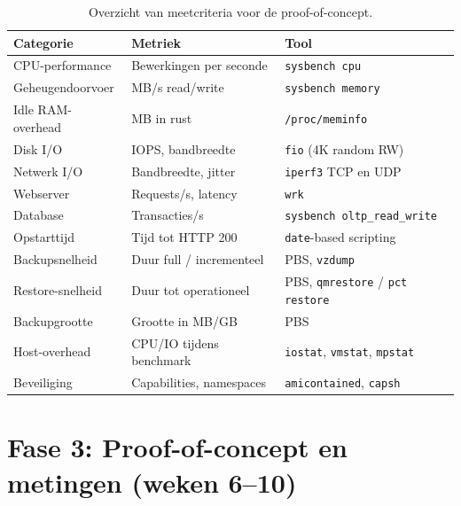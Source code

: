 \begin{table}[h]
    \centering
    \caption[Meetcriteria PoC]{Overzicht van meetcriteria voor de proof-of-concept.}
    \label{tab:meetcriteria}
    \begin{tabular}{lll}
        \toprule
        \textbf{Categorie} & \textbf{Metriek} & \textbf{Tool} \\
        \midrule
        CPU-performance        & Bewerkingen per seconde   & \texttt{sysbench cpu} \\
        Geheugendoorvoer       & MB/s read/write           & \texttt{sysbench memory} \\
        Idle RAM-overhead      & MB in rust                & \texttt{/proc/meminfo} \\
        Disk I/O               & IOPS, bandbreedte         & \texttt{fio} (4K random RW) \\
        Netwerk I/O            & Bandbreedte, jitter       & \texttt{iperf3} TCP en UDP \\
        Webserver              & Requests/s, latency       & \texttt{wrk} \\
        Database               & Transacties/s             & \texttt{sysbench oltp\_read\_write} \\
        Opstarttijd            & Tijd tot HTTP 200         & \texttt{date}-based scripting \\
        Backupsnelheid         & Duur full / incrementeel  & PBS, \texttt{vzdump} \\
        Restore-snelheid       & Duur tot operationeel     & PBS, \texttt{qmrestore} / \texttt{pct restore} \\
        Backupgrootte          & Grootte in MB/GB          & PBS \\
        Host-overhead          & CPU/IO tijdens benchmark  & \texttt{iostat}, \texttt{vmstat}, \texttt{mpstat} \\
        Beveiliging            & Capabilities, namespaces  & \texttt{amicontained}, \texttt{capsh} \\
        \bottomrule
    \end{tabular}
\end{table}

\section{Fase 3: Proof-of-concept en metingen (weken 6--10)}
\label{sec:fase3-poc}

